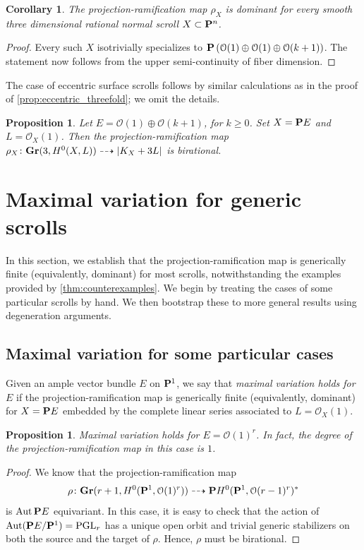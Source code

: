 \documentclass[11pt,reqno]{amsart}
\theoremstyle{plain}
\newtheorem{proposition}[theorem]{Proposition}
\newtheorem{corollary}[theorem]{Corollary}
\theoremstyle{definition}
\theoremstyle{remark}
\numberwithin{equation}{section}
\numberwithin{equation}{section}
\renewcommand{\O}{\mathcal O}
\begin{document}
\begin{corollary}\label{cor:maxvariation3scrolls}
  The projection-ramification map $\rho_{X}$ is dominant for every smooth three dimensional rational normal scroll $X \subset \P^{n}$.
\end{corollary}
\begin{proof}
  Every such $X$ isotrivially specializes to $\P \left(\O(1) \oplus \O(1) \oplus \O(k+1)\right)$.
  The statement now follows from the upper semi-continuity of fiber dimension.
\end{proof}

The case of eccentric surface scrolls follows by similar calculations as in the proof of \autoref{prop:eccentric_threefold}; we omit the details.
\begin{proposition}\label{prop:eccentric_surface}
  Let $E = \O(1) \oplus \O(k+1)$, for $k \geq 0$.
  Set $X = \P E$ and $L = \O_X(1)$.
  Then the projection-ramification map $\rho_X \from \Gr(3, H^0(X, L)) \dashrightarrow |K_X + 3L|$ is birational.
\end{proposition}

\section{Maximal variation for generic scrolls}\label{sec:generic}
In this section, we establish that the projection-ramification map is generically finite (equivalently, dominant) for most scrolls, notwithstanding the examples provided by \autoref{thm:counterexamples}.
We begin by treating the cases of some particular scrolls by hand.
We then bootstrap these to more general results using degeneration arguments.

\subsection{Maximal variation for some particular cases}\label{sec:lowdegree}

Given an ample vector bundle $E$ on $\P^1$, we say that \emph{maximal variation holds for $E$} if the projection-ramification map is generically finite (equivalently, dominant) for $X = \P E$ embedded by the complete linear series associated to $L = \O_X(1)$.

\begin{proposition}\label{prop:segre}
  Maximal variation holds for $E = \O(1)^r$.
  In fact, the degree of the projection-ramification map in this case is $1$.
\end{proposition}
\begin{proof}
  We know that the projection-ramification map
  \[ \rho \from \Gr(r+1, H^0(\P^1, \O(1)^r)) \dashrightarrow \P H^0(\P^1, \O(r-1)^r)^*\]
  is $\Aut \P E$ equivariant.
  In this case, it is easy to check that the action of $\Aut (\P E / \P^1) = \PGL_r$ has a unique open orbit and trivial generic stabilizers on both the source and the target of $\rho$.
  Hence, $\rho$ must be birational.  
\end{proof}
\end{document}
